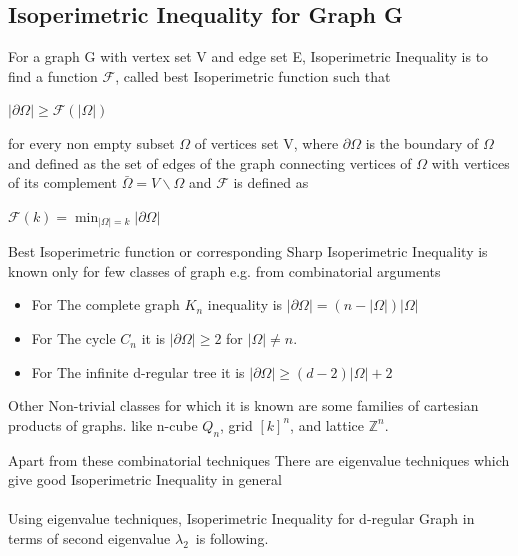 \documentclass[oneside]{book}
\begin{document}
	\hfill \break
	
	
	\subsection{Isoperimetric Inequality for Graph G}
	For a graph G with vertex set V and edge set E, Isoperimetric Inequality is to find a function $\mathcal{F}$, called best  Isoperimetric function such that  \begin{center}
		$|\partial \Omega| \geq \mathcal{F}(|\Omega|)$  
	\end{center}   
	for every non empty subset $\Omega$ of vertices set V, where $\partial \Omega$ is the boundary of $\Omega$  and defined as the set of edges of the graph connecting vertices of $\Omega$ with vertices of its complement $\bar{\Omega} = V \backslash \Omega $ and $\mathcal{F}$ is defined as  \begin{center}
		$\mathscr{F}(k)=\min _{|\Omega|=k}|\partial \Omega|$\par
	\end{center} 
	Best Isoperimetric function or corresponding Sharp Isoperimetric Inequality is known only for few classes of graph e.g.
	from combinatorial arguments 
	\par
	\begin{itemize}
		\item For The complete graph $K_{n}$ inequality is $|\partial \Omega|=(n-|\Omega|) | \Omega|$ 
		\item For The cycle $C_{n}$ it is  $|\partial \Omega|\geq 2$ for $|\Omega| \neq n$.
		\item For The infinite d-regular tree it is $|\partial \Omega| \geq(d-2)| \Omega|+2$\par
	\end{itemize}
	
	
	
	Other Non-trivial classes for which it is known are some families of cartesian products of graphs. like 
	n-cube $Q_{n}$, 
	grid $[k]^{n}$,
	and lattice $\mathbb{Z}^{n}$.
	\par
	Apart from these combinatorial techniques There are eigenvalue techniques which give good Isoperimetric Inequality in general \\\\
	
	Using eigenvalue techniques, 
	Isoperimetric Inequality for d-regular Graph in terms of second eigenvalue $\lambda_2$\ is following. \par
	
\end{document}

